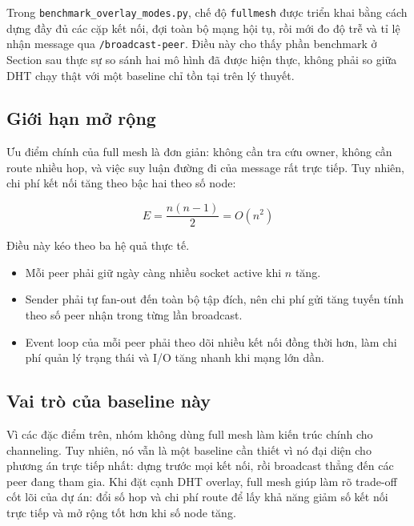 Trong \texttt{benchmark\_overlay\_modes.py}, chế độ \texttt{fullmesh} được triển khai bằng cách dựng đầy đủ các cặp kết nối, đợi toàn bộ mạng hội tụ, rồi mới đo độ trễ và tỉ lệ nhận message qua \texttt{/broadcast-peer}. Điều này cho thấy phần benchmark ở Section sau thực sự so sánh hai mô hình đã được hiện thực, không phải so giữa DHT chạy thật với một baseline chỉ tồn tại trên lý thuyết.

\subsection{Giới hạn mở rộng}
Ưu điểm chính của full mesh là đơn giản: không cần tra cứu owner, không cần route nhiều hop, và việc suy luận đường đi của message rất trực tiếp. Tuy nhiên, chi phí kết nối tăng theo bậc hai theo số node:
\begin{center}
\[
E = \frac{n(n-1)}{2} = O(n^2)
\]
\end{center}

Điều này kéo theo ba hệ quả thực tế.
\begin{itemize}[leftmargin=2em]
    \item Mỗi peer phải giữ ngày càng nhiều socket active khi \(n\) tăng.
    \item Sender phải tự fan-out đến toàn bộ tập đích, nên chi phí gửi tăng tuyến tính theo số peer nhận trong từng lần broadcast.
    \item Event loop của mỗi peer phải theo dõi nhiều kết nối đồng thời hơn, làm chi phí quản lý trạng thái và I/O tăng nhanh khi mạng lớn dần.
\end{itemize}

\subsection{Vai trò của baseline này}
Vì các đặc điểm trên, nhóm không dùng full mesh làm kiến trúc chính cho channeling. Tuy nhiên, nó vẫn là một baseline cần thiết vì nó đại diện cho phương án trực tiếp nhất: dựng trước mọi kết nối, rồi broadcast thẳng đến các peer đang tham gia. Khi đặt cạnh DHT overlay, full mesh giúp làm rõ trade-off cốt lõi của dự án: đổi số hop và chi phí route để lấy khả năng giảm số kết nối trực tiếp và mở rộng tốt hơn khi số node tăng.
